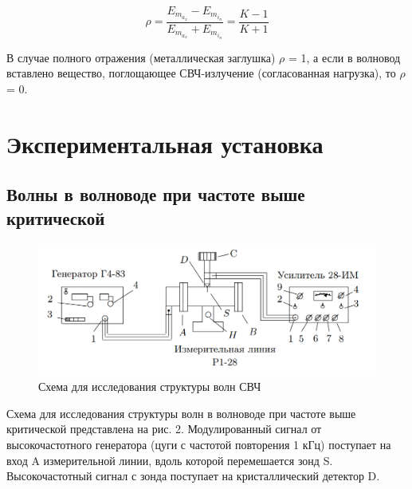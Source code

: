 \documentclass[a4paper]{article}
\begin{document}
\begin{equation}
    \rho = \frac{E_m_a_x - E_m_i_n}{E_m_a_x + E_m_i_n} = \frac{K - 1}{K + 1}
\end{equation}

В случае полного отражения (металлическая заглушка) $\rho$ = 1, а если
в волновод вставлено вещество, поглощающее СВЧ-излучение (согласованная нагрузка), то $\rho$ = 0.

\section{Экспериментальная установка}
\subsection{Волны в волноводе при частоте выше критической}

\begin{figure}[h]
    \centering
    \includegraphics[width=\textwidth]{fig2.PNG}
    \caption{Схема для исследования структуры волн СВЧ}
    \label{fig:vac}
\end{figure}

Схема для исследования структуры волн в волноводе при частоте выше критической представлена на рис. 2. Модулированный сигнал от высокочастотного генератора (цуги с частотой повторения 1 кГц) поступает на вход A измерительной линии, вдоль которой перемешается зонд S. Высокочастотный сигнал с зонда поступает на кристаллический детектор D. \par
\end{document}
